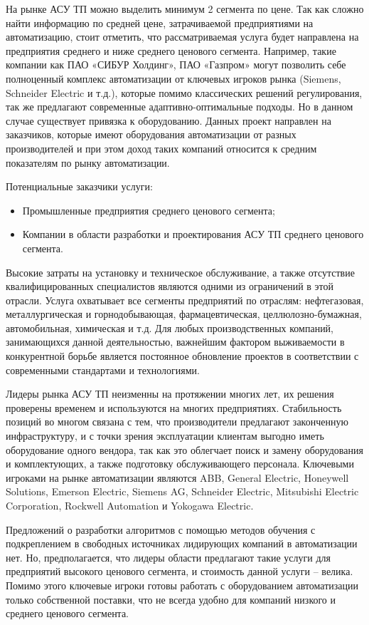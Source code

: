 На рынке АСУ ТП можно выделить минимум 2 сегмента по цене. Так как сложно найти информацию по средней цене, затрачиваемой предприятиями на автоматизацию, стоит отметить, что рассматриваемая услуга будет направлена на предприятия среднего и ниже среднего ценового сегмента. Например, такие компании как ПАО «СИБУР Холдинг», ПАО «Газпром» могут позволить себе полноценный комплекс автоматизации от ключевых игроков рынка (Siemens, Schneider Electric и т.д.), которые помимо классических решений регулирования, так же предлагают современные адаптивно-оптимальные подходы. Но в данном случае существует привязка к оборудованию. Данных проект направлен на заказчиков, которые имеют оборудования автоматизации от разных производителей и при этом доход таких компаний относится к средним показателям по рынку автоматизации.

Потенциальные заказчики услуги:
\begin{itemize}
\item Промышленные предприятия среднего ценового сегмента;
\item Компании в области разработки и проектирования АСУ ТП среднего ценового сегмента.
\end{itemize}

Высокие затраты на установку и техническое обслуживание, а также отсутствие квалифицированных специалистов являются одними из ограничений в этой отрасли.
Услуга охватывает все сегменты предприятий по отраслям: нефтегазовая, металлургическая и горнодобывающая, фармацевтическая, целлюлозно-бумажная, автомобильная, химическая и т.д. Для любых производственных компаний, занимающихся данной деятельностью, важнейшим фактором выживаемости в конкурентной борьбе является постоянное обновление проектов в соответствии с современными стандартами и технологиями.

Лидеры рынка АСУ ТП неизменны на протяжении многих лет, их решения проверены временем и используются на многих предприятиях. Стабильность позиций во многом связана с тем, что производители предлагают законченную инфраструктуру, и с точки зрения эксплуатации клиентам выгодно иметь оборудование одного вендора, так как это облегчает поиск и замену оборудования и комплектующих, а также подготовку обслуживающего персонала.
Ключевыми игроками на рынке автоматизации являются ABB, General Electric, Honeywell Solutions, Emerson Electric, Siemens AG, Schneider Electric, Mitsubishi Electric Corporation,  Rockwell Automation и Yokogawa Electric.

Предложений о разработки алгоритмов с помощью методов обучения с подкреплением в свободных источниках лидирующих компаний в автоматизации нет. Но, предполагается, что лидеры области предлагают такие услуги для предприятий высокого ценового сегмента, и стоимость данной услуги -- велика. Помимо этого ключевые игроки готовы работать с оборудованием автоматизации только собственной поставки, что не всегда удобно для компаний низкого и среднего ценового сегмента.


